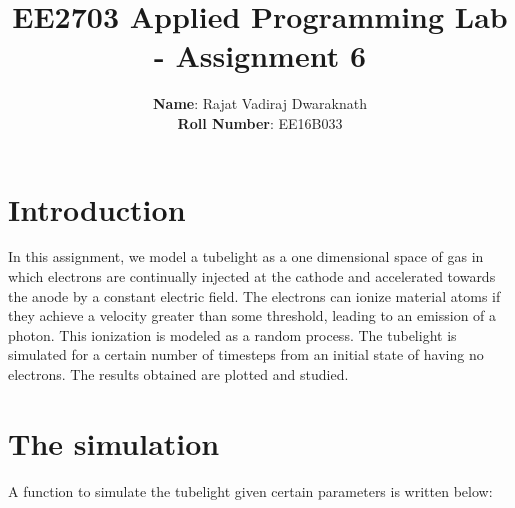 \documentclass[11pt]{article}
\title{EE2703 Applied Programming Lab - Assignment 6}
\author{
  \textbf{Name}: Rajat Vadiraj Dwaraknath\\
  \textbf{Roll Number}: EE16B033
}
\begin{document}
    
    
    \maketitle
    
    

    
	

	
		
    \section{Introduction}\label{introduction}

In this assignment, we model a tubelight as a one dimensional space of
gas in which electrons are continually injected at the cathode and
accelerated towards the anode by a constant electric field. The
electrons can ionize material atoms if they achieve a velocity greater
than some threshold, leading to an emission of a photon. This ionization
is modeled as a random process. The tubelight is simulated for a certain
number of timesteps from an initial state of having no electrons. The
results obtained are plotted and studied.

	

	

	

	

	
		
    \section{The simulation}\label{the-simulation}

A function to simulate the tubelight given certain parameters is written
below:

	

	
		
\end{document}
